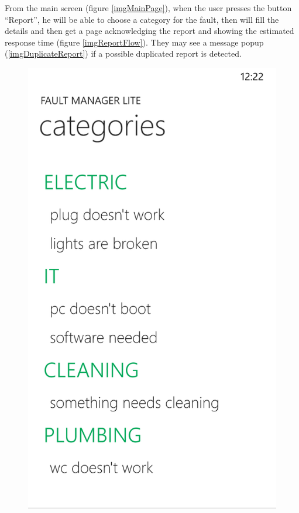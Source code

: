 \documentclass{report}
\begin{document}
From the main screen (figure \ref{imgMainPage}), when the user presses the button ``Report'', he will be able to choose a category for the fault, then will fill the details and then get a page acknowledging the report and showing the estimated response time (figure \ref{imgReportFlow}). They may see a message popup (\ref{imgDuplicateReport}) if a possible duplicated report is detected.

\begin{figure}[hbtp]
\centering
\begin{minipage}{0.3\textwidth}
\includegraphics[width=\textwidth]{img/Categories.png}

\end{minipage}
\end{figure}
\end{document}
